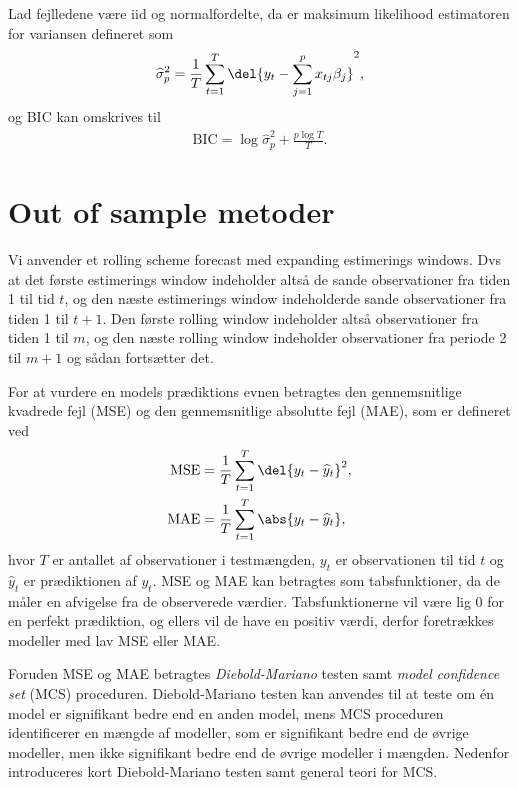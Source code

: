 Lad fejlledene være iid og normalfordelte, da er maksimum likelihood estimatoren for variansen defineret som
\begin{align*}
\widehat{\sigma}_p^2 = \frac{1}{T} \sum_{t=1}^{T} \del{y_t - \sum_{j=1}^p x_{tj}\beta_j}^2,
\end{align*}
og BIC kan omskrives til
\begin{align*}
\text{BIC} = \log \widehat{\sigma}^2_p + \frac{p \log T}{T}.
\end{align*}

\section{Out of sample metoder}
Vi anvender et rolling scheme forecast med expanding estimerings windows. 
Dvs at det første estimerings window indeholder altså de sande observationer fra tiden 1 til tid $t$, og den næste estimerings window indeholderde sande observationer fra tiden 1 til $t+1$.
Den første rolling window indeholder altså observationer fra tiden 1 til $m$, og den næste rolling window indeholder observationer fra periode 2 til $m+1$ og sådan fortsætter det. 

For at vurdere en models prædiktions evnen betragtes den gennemsnitlige kvadrede fejl (MSE) og den gennemsnitlige absolutte fejl (MAE), som er defineret ved
\begin{align}
\text{MSE} & =  \frac{1}{T} \sum_{t=1}^{T} \del{y_{t} - \widehat{y}_{t}}^2, \label{eq:mse}  \\
\text{MAE} & =  \frac{1}{T} \sum_{t=1}^{T} \abs{y_{t} - \widehat{y}_{t}}, \label{eq:mae} 
\end{align} 
hvor $T$ er antallet af observationer i testmængden, $y_{t}$ er observationen til tid $t$ og $\widehat{y}_{t}$ er prædiktionen af $y_{t}$.
MSE og MAE kan betragtes som tabsfunktioner, da de måler en afvigelse fra de observerede værdier.
Tabsfunktionerne vil være lig 0 for en perfekt prædiktion, og ellers vil de have en positiv værdi, derfor foretrækkes modeller med lav MSE eller MAE.

Foruden MSE og MAE betragtes \textit{Diebold-Mariano} testen samt \textit{model confidence set} (MCS) proceduren.
Diebold-Mariano testen kan anvendes til at teste om én model er signifikant bedre end en anden model, mens MCS proceduren identificerer en mængde af modeller, som er signifikant bedre end de øvrige modeller, men ikke signifikant bedre end de øvrige modeller i mængden.
Nedenfor introduceres kort Diebold-Mariano testen samt general teori for MCS.



